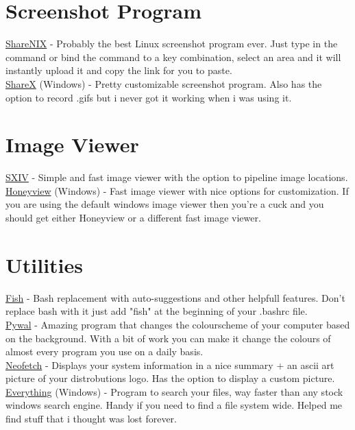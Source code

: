 \documentclass{article}
\begin{document}
\section{Screenshot Program}
	\href{https://github.com/Francesco149/sharenix}{ShareNIX} - Probably the best Linux screenshot program ever. Just type in the command or bind the command to a key combination, select an area and it will instantly upload it and copy the link for you to paste.\\
	\href{https://getsharex.com/}{ShareX} (Windows) - Pretty customizable screenshot program. Also has the option to record .gifs but i never got it working when i was using it.
\section{Image Viewer}
	\href{https://github.com/muennich/sxiv}{SXIV} - Simple and fast image viewer with the option to pipeline image locations.\\
	\href{http://www.bandisoft.com/honeyview/}{Honeyview} (Windows) - Fast image viewer with nice options for customization. If you are using the default windows image viewer then you're a cuck and you should get either Honeyview or a different fast image viewer.
\section{Utilities}
	\href{https://fishshell.com/}{Fish} - Bash replacement with auto-suggestions and other helpfull features. Don't replace bash with it just add "fish" at the beginning of your .bashrc file.\\
	\href{https://github.com/dylanaraps/pywal}{Pywal} - Amazing program that changes the colourscheme of your computer based on the background. With a bit of work you can make it change the colours of almost every program you use on a daily basis.\\
	\href{https://github.com/dylanaraps/neofetch}{Neofetch} - Displays your system information in a nice summary + an ascii art picture of your distrobutions logo. Has the option to display a custom picture.\\
	\href{https://www.voidtools.com/}{Everything} (Windows) - Program to search your files, way faster than any stock windows search engine. Handy if you need to find a file system wide. Helped me find stuff that i thought was lost forever.
\end{document}
